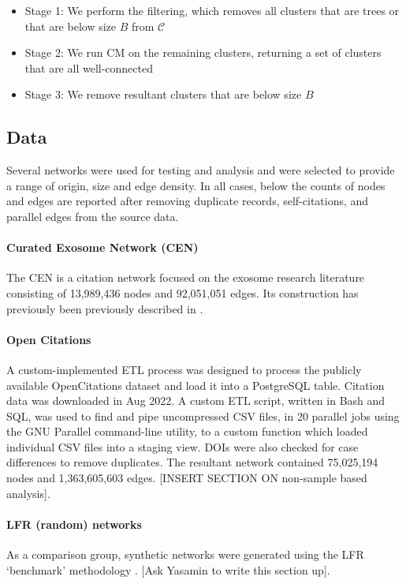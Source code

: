 \documentclass[12pt, oneside]{article}   	%
\begin{document}
\begin{itemize}
\item Stage 1: We perform the filtering, which removes all clusters that are trees or that are below size $B$ from $\mathcal{C}$
\item Stage 2: We run CM on the remaining clusters, returning a set of clusters that are all well-connected
\item Stage 3: We remove resultant clusters that are below size $B$ 
\end{itemize}


\subsection{Data} Several networks were used for testing and analysis and were selected to provide a range of origin, size and edge density. In all cases, below the counts of nodes and edges are reported after removing duplicate records, 
self-citations, and parallel edges from the source data. 

\paragraph{Curated Exosome Network (CEN)}
The CEN is a citation network focused on the exosome research literature consisting of 13,989,436 nodes and 92,051,051 edges. Its construction has previously been previously described in \cite{Jakatdar_2022}.  

\paragraph{Open Citations}
A custom-implemented ETL process was designed to process the publicly available OpenCitations dataset \citep{Peroni2020} and load it into a PostgreSQL table. Citation data was downloaded in Aug 2022. A custom ETL script, written in Bash and SQL, was used to find and pipe uncompressed CSV files, in 20 parallel jobs using the GNU Parallel command-line utility, to a custom function which loaded individual CSV files into a staging view. DOIs were also checked for case differences to remove duplicates.  The resultant network contained 75,025,194 nodes and 1,363,605,603 edges.  [INSERT SECTION ON non-sample based analysis].

\paragraph{LFR (random) networks}
As a comparison group, synthetic networks were generated using the LFR `benchmark' methodology \citep{Lancichinetti2008}. [Ask Yasamin to write this section up].
\end{document}
